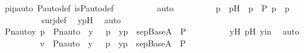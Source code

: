 \begin{isabellebody}
\ pipauto\ P{\isacharunderscore}{\kern0pt}auto{\isacharunderscore}{\kern0pt}def\ is{\isacharunderscore}{\kern0pt}P{\isacharunderscore}{\kern0pt}auto{\isacharunderscore}{\kern0pt}def\isanewline
\ \ \ \ \ \ \ \ \isamarkupfalse%
\ auto\isanewline
\ \ \ \ \ \ \isamarkupfalse%
\ \isamarkupfalse%
\ p{\isacharprime}{\kern0pt}\ \ p{\isacharprime}{\kern0pt}H\ {\isacharcolon}{\kern0pt}\ {\isachardoublequoteopen}p{\isacharprime}{\kern0pt}\ {\isasymin}\ P{\isachardoublequoteclose}\ {\isachardoublequoteopen}p\ {\isacharequal}{\kern0pt}\ {\isasympi}{\isacharbackquote}{\kern0pt}p{\isacharprime}{\kern0pt}{\isachardoublequoteclose}\ \isanewline
\ \ \ \ \ \ \ \ \isamarkupfalse%
\ surj{\isacharunderscore}{\kern0pt}def\ \isamarkupfalse%
\ ypH\ \isamarkupfalse%
\ auto\ \isanewline
\isanewline
\ \ \ \ \ \ \isamarkupfalse%
\ {\isachardoublequoteopen}{\isacharless}{\kern0pt}Pn{\isacharunderscore}{\kern0pt}auto{\isacharparenleft}{\kern0pt}{\isasympi}{\isacharparenright}{\kern0pt}{\isacharbackquote}{\kern0pt}y{\isacharprime}{\kern0pt}{\isacharcomma}{\kern0pt}\ {\isasympi}{\isacharbackquote}{\kern0pt}p{\isacharprime}{\kern0pt}{\isachargreater}{\kern0pt}\ {\isasymin}\ {\isacharbraceleft}{\kern0pt}{\isasymlangle}Pn{\isacharunderscore}{\kern0pt}auto{\isacharparenleft}{\kern0pt}{\isasympi}{\isacharparenright}{\kern0pt}\ {\isacharbackquote}{\kern0pt}\ y{\isacharcomma}{\kern0pt}\ {\isasympi}\ {\isacharbackquote}{\kern0pt}\ p{\isasymrangle}\ {\isachardot}{\kern0pt}\ {\isasymlangle}y{\isacharcomma}{\kern0pt}p{\isasymrangle}\ {\isasymin}\ sep{\isacharunderscore}{\kern0pt}Base{\isacharparenleft}{\kern0pt}A{\isacharparenright}{\kern0pt}\ {\isasymtimes}\ P{\isacharbraceright}{\kern0pt}{\isachardoublequoteclose}\isanewline
\ \ \ \ \ \ \ \ \isamarkupfalse%
\ y{\isacharprime}{\kern0pt}H\ p{\isacharprime}{\kern0pt}H\ y{\isacharprime}{\kern0pt}in\ \isamarkupfalse%
\ auto\ \isanewline
\ \ \ \ \ \ \isamarkupfalse%
\ \isamarkupfalse%
\ {\isachardoublequoteopen}v\ {\isasymin}\ {\isacharbraceleft}{\kern0pt}{\isasymlangle}Pn{\isacharunderscore}{\kern0pt}auto{\isacharparenleft}{\kern0pt}{\isasympi}{\isacharparenright}{\kern0pt}\ {\isacharbackquote}{\kern0pt}\ y{\isacharcomma}{\kern0pt}\ {\isasympi}\ {\isacharbackquote}{\kern0pt}\ p{\isasymrangle}\ {\isachardot}{\kern0pt}\ {\isasymlangle}y{\isacharcomma}{\kern0pt}p{\isasymrangle}\ {\isasymin}\ sep{\isacharunderscore}{\kern0pt}Base{\isacharparenleft}{\kern0pt}A{\isacharparenright}{\kern0pt}\ {\isasymtimes}\ P{\isacharbraceright}{\kern0pt}{\isachardoublequoteclose}\ \isanewline

\end{isabellebody}
